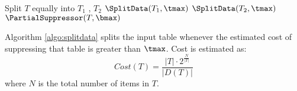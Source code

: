 \begin{algorithm}
\caption{$\SplitData(T,\tmax)$} \label{algo:splitdata}
\begin{algorithmic}[1]
        \STATE Split $T$ equally into $T_1$ , $T_2$
        \STATE $\SplitData(T_1,  \tmax)$
        \STATE $\SplitData(T_2, \tmax)$
    \ELSE
        \STATE $\PartialSuppressor(T,  \bmax)$
    \ENDIF
\end{algorithmic}
\end{algorithm}

Algorithm \ref{algo:splitdata}
splits the input table whenever the estimated cost of
suppressing that table is greater than $\tmax$. 
Cost is estimated as:
\begin{equation}\label{eq:costfunc}
Cost(T)=\frac{|T|\cdot 2^{\frac{N}{|T|}}}{|D(T)|}
\end{equation}
where $N$ is the total number of items in $T$. 
